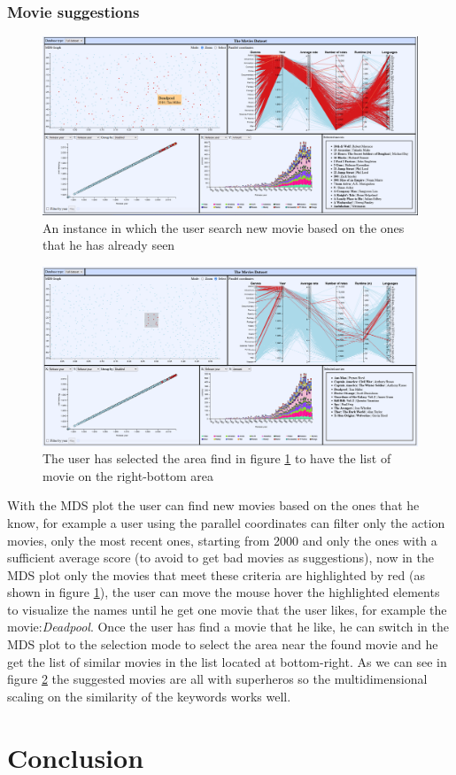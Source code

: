 \documentclass[]{article}
\begin{document}
\subsubsection{Movie suggestions}
\begin{figure}[H]
	\centering
	\includegraphics[width=1\linewidth]{images/insights_suggestion1}
	\caption{An instance in which the user search new movie based on the ones that he has already seen}
	\label{fig:insightssuggestion}
\end{figure}
\begin{figure}[H]
	\centering
	\includegraphics[width=1\linewidth]{images/insights_suggestion2}
	\caption{The user has selected the area find in figure \ref{fig:insightssuggestion} to have the list of movie on the right-bottom area}
	\label{fig:insightssuggestion2}
\end{figure}
With the MDS plot the user can find new movies based on the ones that he know, for example a user using the parallel coordinates can filter only the action movies, only the most recent ones, starting from 2000 and only the ones with a sufficient average score (to avoid to get bad movies as suggestions), now in the MDS plot only the movies that meet these criteria are highlighted by red (as shown in figure \ref{fig:insightssuggestion}), the user can move the mouse hover the highlighted elements to visualize the names until he get one movie that the user likes, for example the movie:\emph{Deadpool}.\newline
Once the user has find a movie that he like, he can switch in the MDS plot to the selection mode to select the area near the found movie and he get the list of similar movies in the list located at bottom-right.\newline
As we can see in figure \ref{fig:insightssuggestion2} the suggested movies are all with superheros so the multidimensional scaling on the similarity of the keywords works well.


\section{Conclusion}
\end{document}
